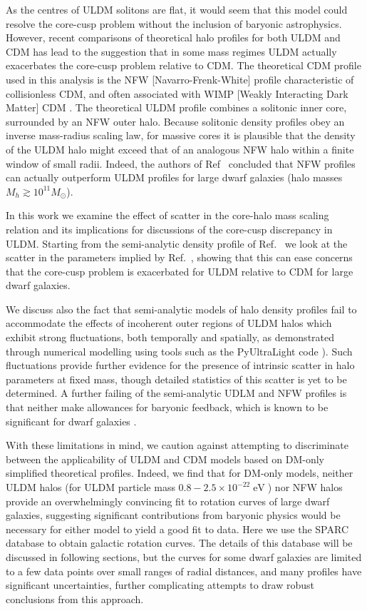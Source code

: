 \documentclass{pasa}%
\begin{document}
As the centres of ULDM solitons are flat, it would seem that this model could resolve the core-cusp problem without the inclusion of baryonic astrophysics. However, recent comparisons of theoretical halo profiles for both ULDM and CDM has lead to the suggestion that in some mass regimes ULDM actually exacerbates the core-cusp problem relative to CDM. The theoretical CDM profile used in this analysis is the NFW [Navarro-Frenk-White] profile \cite{Navarro:1995iw} characteristic of collisionless CDM, and often associated with WIMP [Weakly Interacting Dark Matter] CDM \cite{Robles:2018fur}. The theoretical ULDM profile combines a solitonic inner core, surrounded by an NFW outer halo. Because solitonic density profiles obey an inverse mass-radius scaling law, for massive cores it is plausible that the density of the ULDM halo might exceed that of an analogous NFW halo within a finite window of small radii. Indeed, the authors of Ref~\cite{Robles:2018fur} concluded that NFW profiles can actually outperform ULDM profiles for large dwarf galaxies (halo masses $M_h \gtrsim 10^{11} M_{\odot}$).  


In this work we examine the effect of scatter in the core-halo mass scaling relation and its implications for discussions of the core-cusp discrepancy in ULDM. Starting from the semi-analytic density profile of Ref.~\cite{Robles:2018fur} we look at the scatter in the parameters implied by Ref.~\cite{Schive:2014hza}, showing that this can ease concerns that the core-cusp problem is  exacerbated for ULDM relative to CDM for large dwarf galaxies. 

We discuss also the fact that semi-analytic models of halo density profiles fail to accommodate the effects of incoherent outer regions of ULDM halos which exhibit strong fluctuations, both temporally and spatially, as demonstrated through numerical modelling using tools such as the {\sc PyUltraLight} code \cite{Edwards:2018ccc}). Such fluctuations provide further evidence for the presence of intrinsic scatter in halo parameters at fixed mass, though detailed statistics of this scatter is yet to be determined. A further failing of the semi-analytic UDLM and NFW profiles is that neither make allowances for baryonic feedback, which is known to be significant for dwarf galaxies \cite{2018MNRAS.473.5698D, Benitez-Llambay:2018}. 

With these limitations in mind, we caution against attempting to discriminate between the applicability of ULDM and CDM models based on DM-only simplified theoretical profiles. Indeed, we find that for DM-only models, neither ULDM halos (for ULDM particle mass $0.8-2.5\times 10^{-22} \operatorname{eV}$)
nor NFW halos provide an overwhelmingly convincing fit to rotation curves of large dwarf galaxies, suggesting significant contributions from baryonic physics would be necessary for either model to yield a good fit to data. Here we use the SPARC database \cite{Lelli:2016zqa} to obtain galactic rotation curves. The details of this database will be discussed in following sections, but the curves for some dwarf galaxies are limited to a few data points over small ranges of radial distances, and many profiles have significant uncertainties, further complicating attempts to draw robust conclusions from this approach. 
\end{document}

